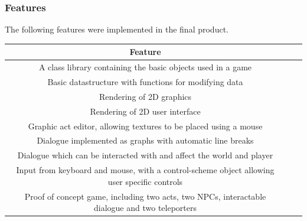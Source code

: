 \documentclass[12pt,a4paper]{article}
\begin{document}
\subsubsection{Features}
The following features were implemented in the final product.
\begin{tabular}{|c|c|c|}
\hline
\textbf{Feature}\\ \hline
A class library containing the basic objects used in a game \\ \hline
Basic datastructure with functions for modifying data \\ \hline
Rendering of 2D graphics \\ \hline
Rendering of 2D user interface \\ \hline
Graphic act editor, allowing textures to be placed using a mouse \\ \hline
Dialogue implemented as graphs with automatic line breaks \\ \hline
Dialogue which can be interacted with and affect the world and player \\ \hline
Input from keyboard and mouse, with a control-scheme object allowing user specific controls \\ \hline
Proof of concept game, including two acts, two NPCs, interactable dialogue and two teleporters \\ \hline
\end{tabular}





\end{document}
